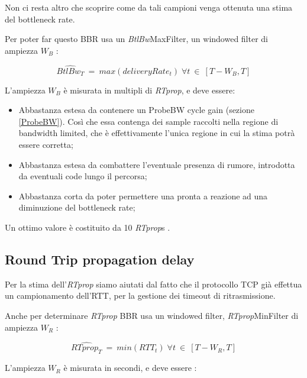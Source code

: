 Non ci resta altro che scoprire come da tali campioni venga ottenuta una stima del bottleneck rate. \bigskip

Per poter far questo BBR usa un \textit{BtlBw}MaxFilter, un windowed filter di ampiezza $ W_{B} $ :

\[
	\widehat{\textit{BtlBw}_{T}} \: = \: max(deliveryRate_{t}) \; \forall t\: \in \: [T-W_{B},T]  
\]

L'ampiezza $ W_{B} $ è misurata in multipli di \textit{RTprop}, e deve essere:

\begin{itemize}

\item Abbastanza estesa da contenere un ProbeBW cycle gain (sezione \ref{ProbeBW}). Così che essa contenga dei sample raccolti nella regione di bandwidth limited, che è effettivamente l'unica regione in cui la stima potrà essere corretta;

\item Abbastanza estesa da combattere l'eventuale presenza di rumore, introdotta da eventuali code lungo il percorsa;

\item Abbastanza corta da poter permettere una pronta a reazione ad una diminuzione del bottleneck rate;

\end{itemize} 

Un ottimo valore è costituito da 10 \textit{RTprop}s \cite[p.~61]{Cardwell:2017:BCC:3042068.3009824}.

\subsection{Round Trip propagation delay}

Per la stima dell'\textit{RTprop} siamo aiutati dal fatto che il protocollo TCP già effettua un campionamento dell'RTT, per la gestione dei timeout di ritrasmissione. \bigskip

Anche per determinare \textit{RTprop} BBR usa un windowed filter, \textit{RTprop}MinFilter di ampiezza $ W_{R} $ :

\[
	\widehat{\textit{RTprop}_{T}} \: = \: min(RTT_{t}) \; \forall t\: \in \: [T-W_{R},T]  
\]

L'ampiezza $ W_{R} $ è misurata in secondi, e deve essere :

